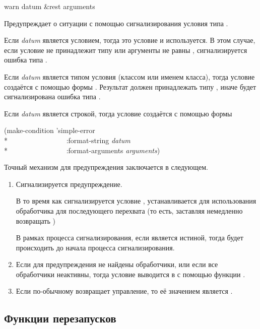 \begin{defun}[Функция]
warn datum &rest arguments

Предупреждает о ситуации с помощью сигнализирования условия типа .

Если \emph{datum} является условием, тогда это условие и используется. В этом
случае, если условие не принадлежит типу  или аргументы
не равны , сигнализируется ошибка типа .

Если \emph{datum} является типом условия (классом или именем класса), тогда
условие создаётся с помощью формы . Результат должен принадлежать типу , иначе
будет сигнализирована ошибка типа .

Если \emph{datum} является строкой, тогда условие создаётся с помощью формы 
\begin{lisp}
(make-condition 'simple-error \\*
~~~~~~~~~~~~~~~~:format-string \emph{datum} \\*
~~~~~~~~~~~~~~~~:format-arguments \emph{arguments})
\end{lisp}
Точный механизм для предупреждения заключается в следующем.
\begin{enumerate}
\item Сигнализируется предупреждение.
  
  В то время как сигнализируется условие , устанавливается
   для использования обработчика для последующего перехвата
   (то есть, заставляя  немедленно возвращать ) 

  В рамках процесса сигнализирования, если  является истиной, тогда  будет происходить
  до начала процесса сигнализирования.

\item Если для предупреждения не найдены обработчики, или если все обработчики
  неактивны, тогда условие выводится в  с помощью функции
  .

\item Если  по-обычному возвращает управление, то её значением
  является .

\end{enumerate}
\end{defun}

\subsection{Функции перезапусков}

